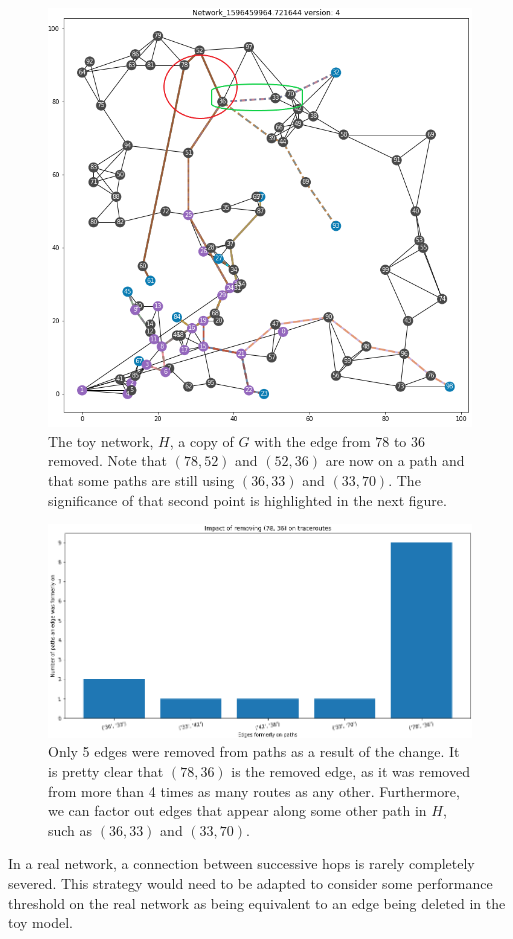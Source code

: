 \documentclass{finalreport}
\begin{document}
\begin{figure}[!ht]
\centering
\includegraphics[width=.7\linewidth]{final/New_78_36.png}
\caption{The toy network, $H$, a copy of $G$ with the edge from $78$ to $36$ removed. Note that $(78, 52)$ and $(52, 36)$ are now on a path and that some paths are still using $(36, 33)$ and $(33, 70)$. The significance of that second point is highlighted in the next figure.}
\end{figure}

\begin{figure}[!ht]
\centering
\includegraphics[width=.85\linewidth]{final/Traceroute-78_36.png}
\caption{Only 5 edges were removed from paths as a result of the change. It is pretty clear that $(78, 36)$ is the removed edge, as it was removed from more than 4 times as many routes as any other. Furthermore, we can factor out edges that appear along some other path in $H$, such as $(36, 33)$ and $(33, 70)$.}
\end{figure}

In a real network, a connection between successive \glspl{hop} is rarely completely severed. This strategy would need to be adapted to consider some performance threshold on the real network as being equivalent to an edge being deleted in the toy model.
\end{document}
